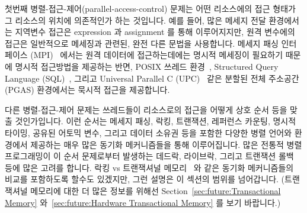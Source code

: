 첫번째 병렬-접근-제어(parallel-access-control) 문제는 어떤 리소스에의 접근
형태가 그 리소스의 위치에 의존적인가 하는 것입니다.
예를 들어, 많은 메세지 전달 환경에서는 지역변수 접근은 expression 과 assignment
를 통해 이루어지지만, 원격 변수에의 접근은 일반적으로 메세징과 관련된, 완전
다른 문법을 사용합니다.
메세지 패싱 인터페이스 (MPI)~\cite{MPIForum2008} 에서는 원격 데이터에
접근하는데에는 명시적 메세징이 필요하기 때문에 명시적 접근방법을 제공하는 반면,
POSIX 쓰레드 환경~\cite{OpenGroup1997pthreads}, Structured Query Language
(SQL)~\cite{DIS9075SQL92}, 그리고 Universal Parallel C
(UPC)~\cite{ElGhazawi2003UPC} 같은 분할된 전체 주소공간(PGAS) 환경에서는 묵시적
접근을 제공합니다.

다른 병렬-접근-제어 문제는 쓰레드들이 리소스로의 접근을 어떻게 상호 순서 등을
맞출 것인가입니다.
이런 순서는 메세지 패싱, 락킹, 트랜잭션, 레퍼런스 카운팅, 명시적 타이밍, 공유된
어토믹 변수, 그리고 데이터 소유권 등을 포함한 다양한 병렬 언어와 환경에서
제공하는 매우 많은 동기화 메커니즘들을 통해 이루어집니다.
많은 전통적 병렬 프로그래밍이 이 순서 문제로부터 발생하는 데드락, 라이브락,
그리고 트랜잭션 롤백 등에 많은 고려를 합니다.
락킹 vs 트랜잭셔널 메모리~\cite{McKenney2007PLOSTM} 와 같은 동기화 메커니즘들의
비교를 포함하도록 할수도 있겠지만, 그런 설명은 이 섹션의 범위를 넘어갑니다.
(트랜잭셔널 메모리에 대한 더 많은 정보를 위해선
Section~\ref{sec:future:Transactional Memory} 와~\ref{sec:future:Hardware
Transactional Memory} 를 보기 바랍니다.)

